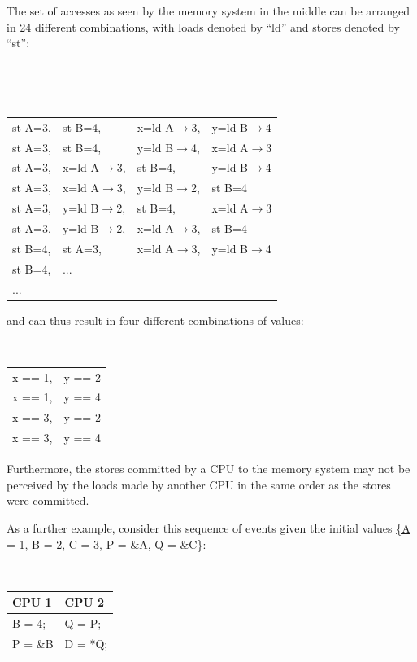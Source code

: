 The set of accesses as seen by the memory system in the middle can be arranged
in 24 different combinations, with loads denoted by ``ld'' and stores
denoted by ``st'':

~ \\
\begin{minipage}[t]{\columnwidth}
\tt
\begin{tabular}{llll}
	st A=3, & st B=4, & x=ld A$\rightarrow$3, & y=ld B$\rightarrow$4 \\
	st A=3, & st B=4, & y=ld B$\rightarrow$4, & x=ld A$\rightarrow$3 \\
	st A=3, & x=ld A$\rightarrow$3, & st B=4, & y=ld B$\rightarrow$4 \\
	st A=3, & x=ld A$\rightarrow$3, & y=ld B$\rightarrow$2, & st B=4 \\
	st A=3, & y=ld B$\rightarrow$2, & st B=4, & x=ld A$\rightarrow$3 \\
	st A=3, & y=ld B$\rightarrow$2, & x=ld A$\rightarrow$3, & st B=4 \\
	st B=4, & st A=3, & x=ld A$\rightarrow$3, & y=ld B$\rightarrow$4 \\
	st B=4, & ... & & \\
	... & & & \\
\end{tabular}
\end{minipage}
\vspace{5pt}

and can thus result in four different combinations of values:

\vspace{5pt}
\begin{minipage}[t]{\columnwidth}
\tt
\begin{tabular}{ll}
	x == 1, & y == 2 \\
	x == 1, & y == 4 \\
	x == 3, & y == 2 \\
	x == 3, & y == 4 \\
\end{tabular}
\end{minipage}
\vspace{5pt}

Furthermore, the stores committed by a CPU to the memory system may not be
perceived by the loads made by another CPU in the same order as the stores were
committed.

As a further example, consider this sequence of events given the
initial values \url{{A = 1, B = 2, C = 3, P = &A, Q = &C}}:

\vspace{5pt}
\begin{minipage}[t]{\columnwidth}
\tt
\begin{tabular}{l|l}
	CPU 1 &		CPU 2 \\
	\hline
	B = 4; &	Q = P; \\
	P = \&B &	D = *Q; \\
\end{tabular}
\end{minipage}
\vspace{5pt}

